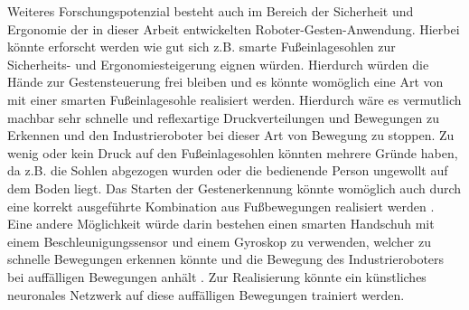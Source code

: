 Weiteres Forschungspotenzial besteht auch im Bereich der Sicherheit und Ergonomie der in dieser Arbeit entwickelten Roboter-Gesten-Anwendung. Hierbei könnte erforscht werden wie gut sich z.B. smarte Fußeinlagesohlen zur Sicherheits- und Ergonomiesteigerung eignen würden. Hierdurch würden die Hände zur Gestensteuerung frei bleiben und es könnte womöglich eine Art von  mit einer smarten Fußeinlagesohle realisiert werden. Hierdurch wäre es vermutlich machbar sehr schnelle und reflexartige Druckverteilungen und Bewegungen zu Erkennen und den Industrieroboter bei dieser Art von Bewegung zu stoppen. Zu wenig oder kein Druck auf den Fußeinlagesohlen könnten mehrere Gründe haben, da z.B. die Sohlen abgezogen wurden oder die bedienende Person ungewollt auf dem Boden liegt. Das Starten der Gestenerkennung könnte womöglich auch durch eine korrekt ausgeführte Kombination aus Fußbewegungen realisiert werden \cite{tan_design_2015}. Eine andere Möglichkeit würde darin bestehen einen smarten Handschuh mit einem Beschleunigungssensor und einem Gyroskop zu verwenden, welcher zu schnelle Bewegungen erkennen könnte und die Bewegung des Industrieroboters bei auffälligen Bewegungen anhält \cite{ghimire_smart_2019}. Zur Realisierung könnte ein künstliches neuronales Netzwerk auf diese auffälligen Bewegungen trainiert werden.

